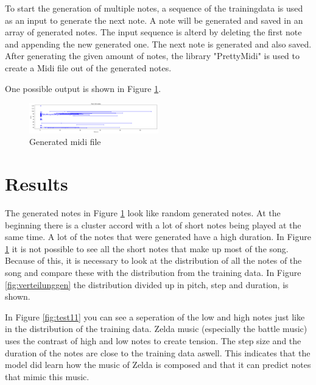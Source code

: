 To start the generation of multiple notes, a sequence of the trainingdata is used as an input to generate the next note.
A note will be generated and saved in an array of generated notes. The input sequence is alterd by deleting the first
note and appending the new generated one. The next note is generated and also saved. After generating the given
amount of notes, the library "PrettyMidi" is used to create a Midi file out of the generated notes.

One possible output is shown in Figure \ref{fig:genNotes}. 


\begin{figure}
\centering
\includegraphics[width=0.5\textwidth]{./pics/genNotes.PNG}
\caption{Generated midi file}
\label{fig:genNotes}    
\end{figure}

\section{Results}
\label{res}

The generated notes in Figure \ref{fig:genNotes} look like random generated notes. At the beginning there is 
a cluster accord with a lot of short notes being played at the same time. A lot of the notes that were generated have 
a high duration. In Figure \ref{fig:genNotes} it is not possible to see all the short notes that make up most of
the song. Because of this, it is necessary to look at the distribution of all the notes of the song and compare these 
with the distribution from the training data. In Figure \ref{fig:verteilunggen} the distribution divided up in 
pitch, step and duration, is shown. 

In Figure \ref{fig:test11} you can see a seperation of the low and high notes just like in the distribution of the training
data. Zelda music (especially the battle music) uses the contrast of high and low notes to create tension. The step size and 
the duration of the notes are close to the training data aswell. This indicates that the model did learn how the music
of Zelda is composed and that it can predict notes that mimic this music.

